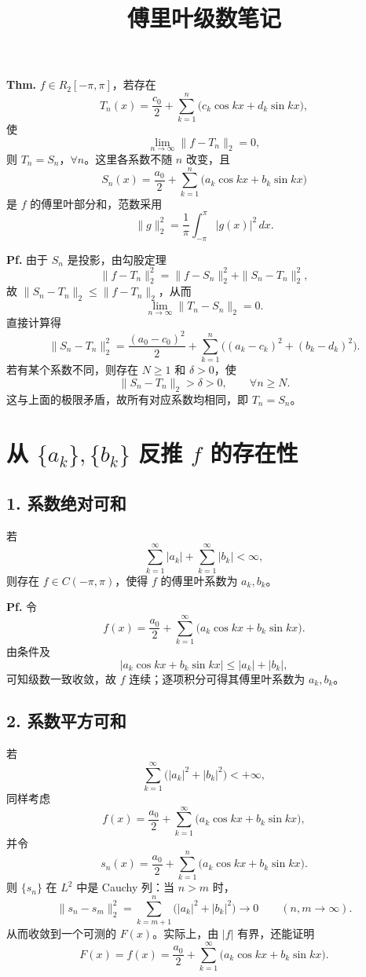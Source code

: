 \documentclass[11pt,a4paper]{ctexart}
\title{傅里叶级数笔记}
\author{}
\date{}
\begin{document}
\maketitle

\noindent\textbf{Thm.}
$f\in R_2[-\pi,\pi]$，若存在
\[
 T_n(x)=\frac{c_0}{2}+\sum_{k=1}^{n}\bigl(c_k\cos kx+d_k\sin kx\bigr),
\]
使
\[
 \lim_{n\to\infty}\|f-T_n\|_2=0,
\]
则 $T_n=S_n$，$\forall n$。这里各系数不随 $n$ 改变，且
\[
 S_n(x)=\frac{a_0}{2}+\sum_{k=1}^{n}\bigl(a_k\cos kx+b_k\sin kx\bigr)
\]
是 $f$ 的傅里叶部分和，范数采用
\[
 \|g\|_2^2=\frac{1}{\pi}\int_{-\pi}^{\pi}|g(x)|^2\,dx.
\]

\medskip
\noindent\textbf{Pf.}
由于 $S_n$ 是投影，由勾股定理
\[
 \|f-T_n\|_2^2=\|f-S_n\|_2^2+\|S_n-T_n\|_2^2,
\]
故 $\|S_n-T_n\|_2\leq\|f-T_n\|_2$，从而
\[
 \lim_{n\to\infty}\|T_n-S_n\|_2=0.
\]
直接计算得
\[
 \|S_n-T_n\|_2^2
 =\frac{(a_0-c_0)^2}{2}
 +\sum_{k=1}^{n}\bigl((a_k-c_k)^2+(b_k-d_k)^2\bigr).
\]
若有某个系数不同，则存在 $N\geq1$ 和 $\delta>0$，使
\[
 \|S_n-T_n\|_2>\delta>0,\qquad\forall n\geq N.
\]
这与上面的极限矛盾，故所有对应系数均相同，即 $T_n=S_n$。

\section*{从 $\{a_k\},\{b_k\}$ 反推 $f$ 的存在性}

\subsection*{1. 系数绝对可和}
若
\[
 \sum_{k=1}^{\infty}|a_k|+\sum_{k=1}^{\infty}|b_k|<\infty,
\]
则存在 $f\in C(-\pi,\pi)$，使得 $f$ 的傅里叶系数为 $a_k,b_k$。

\noindent\textbf{Pf.}
令
\[
 f(x)=\frac{a_0}{2}+\sum_{k=1}^{\infty}
 \bigl(a_k\cos kx+b_k\sin kx\bigr).
\]
由条件及
\[
 |a_k\cos kx+b_k\sin kx|\leq |a_k|+|b_k|,
\]
可知级数一致收敛，故 $f$ 连续；逐项积分可得其傅里叶系数为 $a_k,b_k$。

\subsection*{2. 系数平方可和}
若
\[
 \sum_{k=1}^{\infty}\bigl(|a_k|^2+|b_k|^2\bigr)<+\infty,
\]
同样考虑
\[
 f(x)=\frac{a_0}{2}+\sum_{k=1}^{\infty}
 \bigl(a_k\cos kx+b_k\sin kx\bigr),
\]
并令
\[
 s_n(x)=\frac{a_0}{2}+\sum_{k=1}^{n}
 \bigl(a_k\cos kx+b_k\sin kx\bigr).
\]
则 $\{s_n\}$ 在 $L^2$ 中是 Cauchy 列：当 $n>m$ 时，
\[
 \|s_n-s_m\|_2^2
 =\sum_{k=m+1}^{n}\bigl(|a_k|^2+|b_k|^2\bigr)
 \longrightarrow0\qquad(n,m\to\infty).
\]
从而收敛到一个可测的 $F(x)$。实际上，由 $|f|$ 有界，还能证明
\[
 F(x)=f(x)=\frac{a_0}{2}+\sum_{k=1}^{\infty}
 \bigl(a_k\cos kx+b_k\sin kx\bigr).
\]
\end{document}

